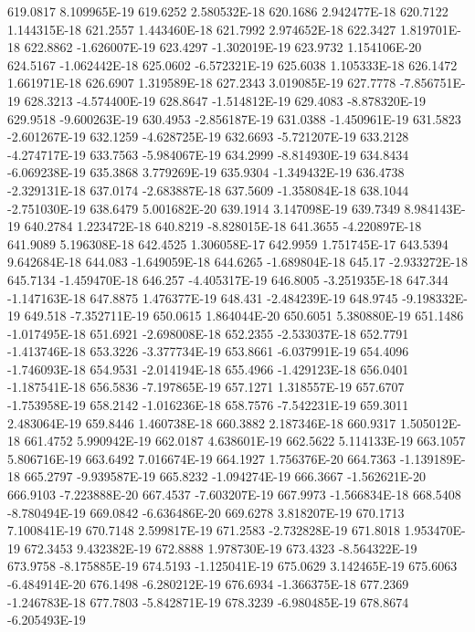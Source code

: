 619.0817  8.109965E-19
619.6252  2.580532E-18
620.1686  2.942477E-18
620.7122  1.144315E-18
621.2557  1.443460E-18
621.7992  2.974652E-18
622.3427  1.819701E-18
622.8862  -1.626007E-19
623.4297  -1.302019E-19
623.9732  1.154106E-20
624.5167  -1.062442E-18
625.0602  -6.572321E-19
625.6038  1.105333E-18
626.1472  1.661971E-18
626.6907  1.319589E-18
627.2343  3.019085E-19
627.7778  -7.856751E-19
628.3213  -4.574400E-19
628.8647  -1.514812E-19
629.4083  -8.878320E-19
629.9518  -9.600263E-19
630.4953  -2.856187E-19
631.0388  -1.450961E-19
631.5823  -2.601267E-19
632.1259  -4.628725E-19
632.6693  -5.721207E-19
633.2128  -4.274717E-19
633.7563  -5.984067E-19
634.2999  -8.814930E-19
634.8434  -6.069238E-19
635.3868  3.779269E-19
635.9304  -1.349432E-19
636.4738  -2.329131E-18
637.0174  -2.683887E-18
637.5609  -1.358084E-18
638.1044  -2.751030E-19
638.6479  5.001682E-20
639.1914  3.147098E-19
639.7349  8.984143E-19
640.2784  1.223472E-18
640.8219  -8.828015E-18
641.3655  -4.220897E-18
641.9089  5.196308E-18
642.4525  1.306058E-17
642.9959  1.751745E-17
643.5394  9.642684E-18
644.083  -1.649059E-18
644.6265  -1.689804E-18
645.17  -2.933272E-18
645.7134  -1.459470E-18
646.257  -4.405317E-19
646.8005  -3.251935E-18
647.344  -1.147163E-18
647.8875  1.476377E-19
648.431  -2.484239E-19
648.9745  -9.198332E-19
649.518  -7.352711E-19
650.0615  1.864044E-20
650.6051  5.380880E-19
651.1486  -1.017495E-18
651.6921  -2.698008E-18
652.2355  -2.533037E-18
652.7791  -1.413746E-18
653.3226  -3.377734E-19
653.8661  -6.037991E-19
654.4096  -1.746093E-18
654.9531  -2.014194E-18
655.4966  -1.429123E-18
656.0401  -1.187541E-18
656.5836  -7.197865E-19
657.1271  1.318557E-19
657.6707  -1.753958E-19
658.2142  -1.016236E-18
658.7576  -7.542231E-19
659.3011  2.483064E-19
659.8446  1.460738E-18
660.3882  2.187346E-18
660.9317  1.505012E-18
661.4752  5.990942E-19
662.0187  4.638601E-19
662.5622  5.114133E-19
663.1057  5.806716E-19
663.6492  7.016674E-19
664.1927  1.756376E-20
664.7363  -1.139189E-18
665.2797  -9.939587E-19
665.8232  -1.094274E-19
666.3667  -1.562621E-20
666.9103  -7.223888E-20
667.4537  -7.603207E-19
667.9973  -1.566834E-18
668.5408  -8.780494E-19
669.0842  -6.636486E-20
669.6278  3.818207E-19
670.1713  7.100841E-19
670.7148  2.599817E-19
671.2583  -2.732828E-19
671.8018  1.953470E-19
672.3453  9.432382E-19
672.8888  1.978730E-19
673.4323  -8.564322E-19
673.9758  -8.175885E-19
674.5193  -1.125041E-19
675.0629  3.142465E-19
675.6063  -6.484914E-20
676.1498  -6.280212E-19
676.6934  -1.366375E-18
677.2369  -1.246783E-18
677.7803  -5.842871E-19
678.3239  -6.980485E-19
678.8674  -6.205493E-19
